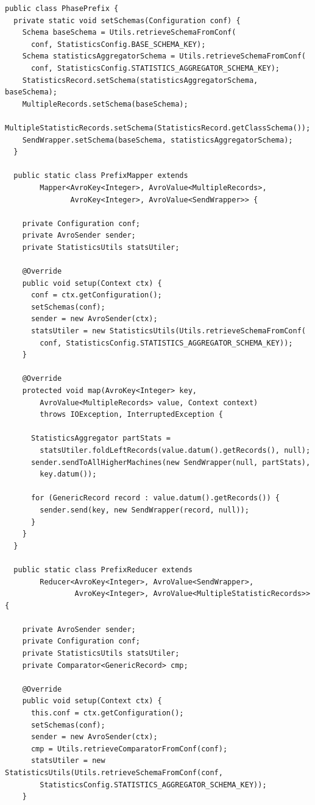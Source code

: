 \documentclass[magisterska]{pracamgr}
\begin{document}
\begin{lstlisting}[language=SmallJava,firstnumber=1,label=hadoop_prefix,caption=Faza liczenia statystyk prefiksowych]
public class PhasePrefix {
  private static void setSchemas(Configuration conf) {
    Schema baseSchema = Utils.retrieveSchemaFromConf(
      conf, StatisticsConfig.BASE_SCHEMA_KEY);
    Schema statisticsAggregatorSchema = Utils.retrieveSchemaFromConf(
      conf, StatisticsConfig.STATISTICS_AGGREGATOR_SCHEMA_KEY);
    StatisticsRecord.setSchema(statisticsAggregatorSchema, baseSchema);
    MultipleRecords.setSchema(baseSchema);
    MultipleStatisticRecords.setSchema(StatisticsRecord.getClassSchema());
    SendWrapper.setSchema(baseSchema, statisticsAggregatorSchema);
  }

  public static class PrefixMapper extends
        Mapper<AvroKey<Integer>, AvroValue<MultipleRecords>,
               AvroKey<Integer>, AvroValue<SendWrapper>> {

    private Configuration conf;
    private AvroSender sender;
    private StatisticsUtils statsUtiler;

    @Override
    public void setup(Context ctx) {
      conf = ctx.getConfiguration();
      setSchemas(conf);
      sender = new AvroSender(ctx);
      statsUtiler = new StatisticsUtils(Utils.retrieveSchemaFromConf(
        conf, StatisticsConfig.STATISTICS_AGGREGATOR_SCHEMA_KEY));
    }

    @Override
    protected void map(AvroKey<Integer> key,
        AvroValue<MultipleRecords> value, Context context)
        throws IOException, InterruptedException {
        
      StatisticsAggregator partStats = 
        statsUtiler.foldLeftRecords(value.datum().getRecords(), null);
      sender.sendToAllHigherMachines(new SendWrapper(null, partStats),
        key.datum());
        
      for (GenericRecord record : value.datum().getRecords()) {
        sender.send(key, new SendWrapper(record, null));
      }
    }
  }

  public static class PrefixReducer extends
        Reducer<AvroKey<Integer>, AvroValue<SendWrapper>,
                AvroKey<Integer>, AvroValue<MultipleStatisticRecords>> {

    private AvroSender sender;
    private Configuration conf;
    private StatisticsUtils statsUtiler;
    private Comparator<GenericRecord> cmp;

    @Override
    public void setup(Context ctx) {
      this.conf = ctx.getConfiguration();
      setSchemas(conf);
      sender = new AvroSender(ctx);
      cmp = Utils.retrieveComparatorFromConf(conf);
      statsUtiler = new StatisticsUtils(Utils.retrieveSchemaFromConf(conf,
        StatisticsConfig.STATISTICS_AGGREGATOR_SCHEMA_KEY));
    }


\end{lstlisting}
\end{document}
